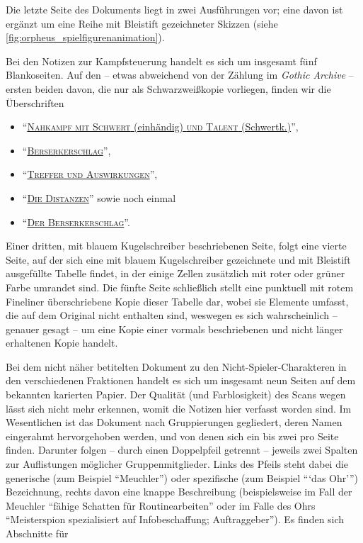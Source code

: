 \documentclass[a5paper,pagesize,numbers=noenddot]{scrbook}
\begin{document}
\noindent Die letzte Seite des Dokuments liegt in zwei Ausführungen vor; eine davon ist ergänzt um eine Reihe mit Bleistift gezeichneter Skizzen (siehe \autoref{fig:orpheus_spielfigurenanimation}).


Bei den Notizen zur Kampfsteuerung handelt es sich um insgesamt fünf Blankoseiten.
Auf den -- etwas abweichend von der Zählung im \textit{Gothic Archive} -- ersten beiden davon, die nur als Schwarzweißkopie vorliegen, finden wir die Überschriften

\begin{itemize}
   \item \enquote{\uline{\textsc{Nahkampf mit Schwert} (einhändig) \textsc{und Talent} (Schwertk.)}},
   \item \enquote{\uline{\textsc{Berserkerschlag}}},
   \item \enquote{\uline{\textsc{Treffer und Auswirkungen}}},
   \item \enquote{\uline{\textsc{Die Distanzen}}} sowie noch einmal
   \item \enquote{\uline{\textsc{Der Berserkerschlag}}}.
\end{itemize}

Einer dritten, mit blauem Kugelschreiber beschriebenen Seite, folgt eine vierte Seite, auf der sich eine mit blauem Kugelschreiber gezeichnete und mit Bleistift ausgefüllte Tabelle findet, in der einige Zellen zusätzlich mit roter oder grüner Farbe umrandet sind.
Die fünfte Seite schließlich stellt eine punktuell mit rotem Fineliner überschriebene Kopie dieser Tabelle dar, wobei sie Elemente umfasst, die auf dem Original nicht enthalten sind, weswegen es sich wahrscheinlich -- genauer gesagt -- um eine Kopie einer vormals beschriebenen und nicht länger erhaltenen Kopie handelt.


Bei dem nicht näher betitelten Dokument zu den Nicht-Spieler-Charakteren in den verschiedenen Fraktionen handelt es sich um insgesamt neun Seiten auf dem bekannten karierten Papier. %
Der Qualität (und Farblosigkeit) des Scans wegen lässt sich nicht mehr erkennen, womit die Notizen hier verfasst worden sind. %
Im Wesentlichen ist das Dokument nach Gruppierungen gegliedert, deren Namen eingerahmt hervorgehoben werden, und von denen sich ein bis zwei pro Seite finden.
Darunter folgen -- durch einen Doppelpfeil getrennt -- jeweils zwei Spalten zur Auflistungen möglicher Gruppenmitglieder.
Links des Pfeils steht dabei die generische (zum Beispiel \enquote{Meuchler}) oder spezifische (zum Beispiel \enquote{\enquote{das Ohr}}) Bezeichnung, rechts davon eine knappe Beschreibung (beispielsweise im Fall der Meuchler \enquote{fähige Schatten für Routinearbeiten} oder im Falle des Ohrs \enquote{Meisterspion spezialisiert auf Infobeschaffung; Auftraggeber}).\autocite[S.~2]{orpheus_nscs}
Es finden sich Abschnitte für
\end{document}
